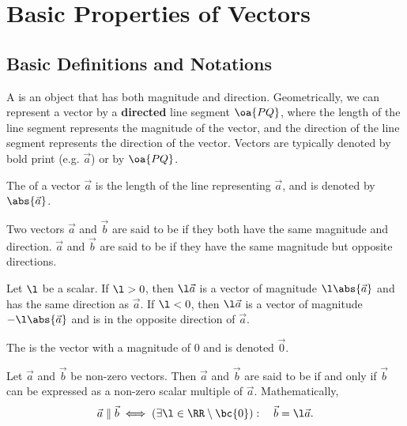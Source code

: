 \chapter{Basic Properties of Vectors}

\section{Basic Definitions and Notations}

\begin{definition}
    A  is an object that has both magnitude and direction. Geometrically, we can represent a vector by a \textbf{directed} line segment $\oa{PQ}$, where the length of the line segment represents the magnitude of the vector, and the direction of the line segment represents the direction of the vector. Vectors are typically denoted by bold print (e.g. $\vec a$) or by $\oa{PQ}$.
\end{definition}

\begin{definition}
    The  of a vector $\vec a$ is the length of the line representing $\vec a$, and is denoted by $\abs{\vec a}$.
\end{definition}

\begin{definition}
    Two vectors $\vec a$ and $\vec b$ are said to be  if they both have the same magnitude and direction. $\vec a$ and $\vec b$ are said to be  if they have the same magnitude but opposite directions.
\end{definition}

\begin{definition}
    Let $\l$ be a scalar. If $\l > 0$, then $\l \vec a$ is a vector of magnitude $\l \abs{\vec a}$ and has the same direction as $\vec a$. If $\l < 0$, then $\l \vec a$ is a vector of magnitude $-\l \abs{\vec a}$ and is in the opposite direction of $\vec a$.
\end{definition}

\begin{definition}
    The  is the vector with a magnitude of 0 and is denoted $\vec 0$.
\end{definition}

\begin{definition}
    Let $\vec a$ and $\vec b$ be non-zero vectors. Then $\vec a$ and $\vec b$ are said to be  if and only if $\vec b$ can be expressed as a non-zero scalar multiple of $\vec a$. Mathematically, \[\vec a \parallel \vec b \iff (\exists \l \in \RR \setminus \bc{0}): \quad \vec b = \l \vec a.\]
\end{definition}

